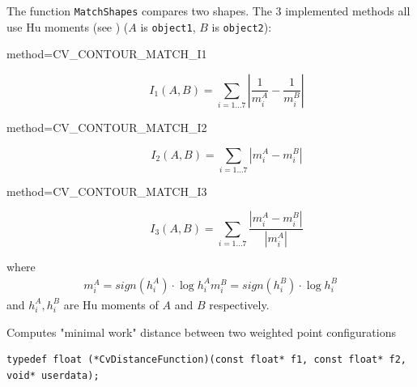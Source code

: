 \begin{description}
\end{description}

The function \texttt{MatchShapes} compares two shapes. The 3 implemented methods all use Hu moments (see ) ($A$ is \texttt{object1}, $B$ is \texttt{object2}):

\begin{description}
\item[method=CV\_CONTOUR\_MATCH\_I1]
\[ I_1(A,B) = \sum_{i=1...7} \left| \frac{1}{m^A_i} - \frac{1}{m^B_i} \right| \]

\item[method=CV\_CONTOUR\_MATCH\_I2]
\[ I_2(A,B) = \sum_{i=1...7} \left| m^A_i - m^B_i \right| \]

\item[method=CV\_CONTOUR\_MATCH\_I3]
\[ I_3(A,B) = \sum_{i=1...7} \frac{ \left| m^A_i - m^B_i \right| }{ \left| m^A_i \right| } \]
\end{description}

where
\[
\begin{array}{l}
m^A_i = sign(h^A_i) \cdot \log{h^A_i}
m^B_i = sign(h^B_i) \cdot \log{h^B_i}
\end{array}
\]
and $h^A_i, h^B_i$ are Hu moments of $A$ and $B$ respectively.

\label{CalcEMD2}

Computes "minimal work" distance between two weighted point configurations


\begin{lstlisting}
typedef float (*CvDistanceFunction)(const float* f1, const float* f2, void* userdata);
\end{lstlisting}

